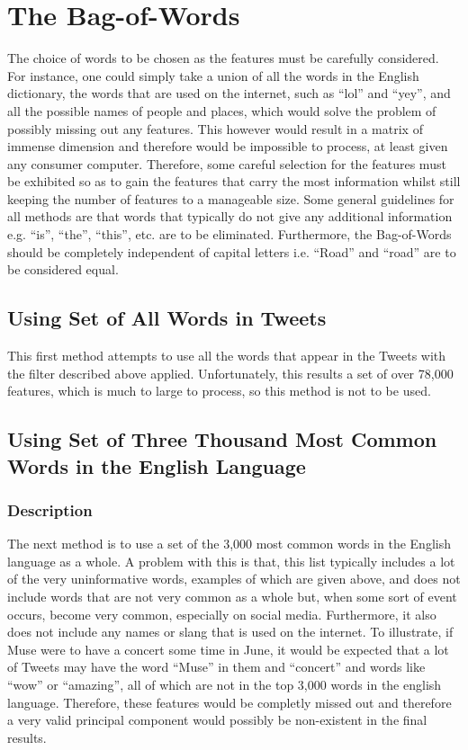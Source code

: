\documentclass[11pt,a4paper]{article}
\begin{document}
\section{The Bag-of-Words}
The choice of words to be chosen as the features must be carefully considered. For instance, one could simply take a union of all the words in the English dictionary, the words that are used on the internet, such as ``lol'' and ``yey'', and all the possible names of people and places, which would solve the problem of possibly missing out any features. This however would result in a matrix of immense dimension and therefore would be impossible to process, at least given any consumer computer. Therefore, some careful selection for the features must be exhibited so as to gain the features that carry the most information whilst still keeping the number of features to a manageable size. Some general guidelines for all methods are that words that typically do not give any additional information e.g. ``is'', ``the'', ``this'', etc. are to be eliminated. Furthermore, the Bag-of-Words should be completely independent of capital letters i.e. ``Road'' and ``road'' are to be considered equal.
\subsection{Using Set of All Words in Tweets}
This first method attempts to use all the words that appear in the Tweets with the filter described above applied. Unfortunately, this results a set of over 78,000 features, which is much to large to process, so this method is not to be used. 
\subsection{Using Set of Three Thousand Most Common Words in the English Language}
\subsubsection{Description}
The next method is to use a set of the 3,000 most common words in the English language as a whole. A problem with this is that, this list typically includes a lot of the very uninformative words, examples of which are given above, and does not include words that are not very common as a whole but, when some sort of event occurs, become very common, especially on social media. Furthermore, it also does not include any names or slang that is used on the internet. To illustrate, if Muse were to have a concert some time in June, it would be expected that a lot of Tweets may have the word ``Muse'' in them and ``concert'' and words like ``wow'' or ``amazing'', all of which are not in the top 3,000 words in the english language. Therefore, these features would be completly missed out and therefore a very valid principal component would possibly be non-existent in the final results.
\end{document}
